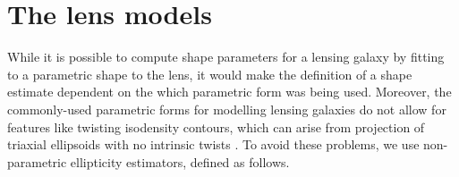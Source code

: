 \documentclass[useAMS,usenatbib]{mn2e}
\begin{document}
\section{The lens models}\label{sec:shapemethod}

While it is possible to compute shape parameters for a lensing galaxy by fitting to a parametric shape to the lens, it would make the definition of a shape estimate dependent on the which parametric form was being used. Moreover, the commonly-used parametric forms for modelling lensing galaxies \citep[e.g.][]{2001astro.ph..2341K} do not allow for features like twisting isodensity contours, which can arise from projection of triaxial ellipsoids with no intrinsic twists \citep[e.g.][and references therein]{1978ComAp...8...27B}. To avoid these problems, we use non-parametric ellipticity estimators, defined as follows.
\end{document}
